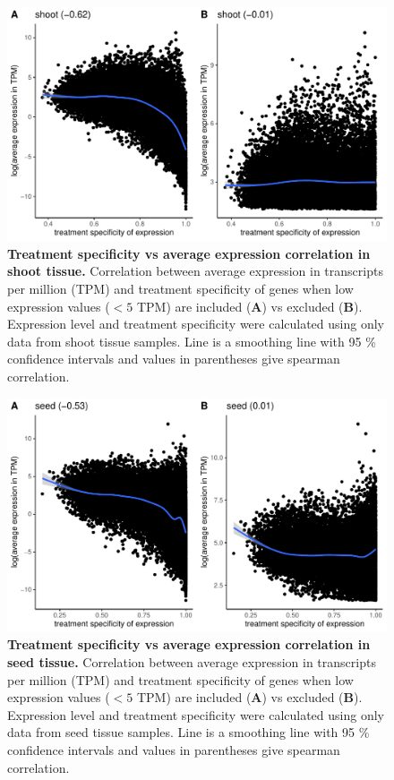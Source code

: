 \documentclass[12pt]{article}
\begin{document}
\begin{figure}[H]
\centering
\includegraphics[width = \linewidth]{figures/appendix_a/shoot_treatmentSpecificityVsAverageExpression_withVsWithoutZeros.pdf}
\caption{\textbf{Treatment specificity vs average expression correlation in shoot tissue.} Correlation between average expression in transcripts per million (TPM) and treatment specificity of genes when low expression values ($< 5$ TPM) are included (\textbf{A}) vs excluded (\textbf{B}). Expression level and treatment specificity were calculated using only data from shoot tissue samples. Line is a smoothing line with 95 \% confidence intervals and values in parentheses give spearman correlation.}%
\end{figure}

\begin{figure}[H]
\centering
\includegraphics[width = \linewidth]{figures/appendix_a/seed_treatmentSpecificityVsAverageExpression_withVsWithoutZeros.pdf}
\caption{\textbf{Treatment specificity vs average expression correlation in seed tissue.} Correlation between average expression in transcripts per million (TPM) and treatment specificity of genes when low expression values ($< 5$ TPM) are included (\textbf{A}) vs excluded (\textbf{B}). Expression level and treatment specificity were calculated using only data from seed tissue samples. Line is a smoothing line with 95 \% confidence intervals and values in parentheses give spearman correlation.}%
\end{figure}
\end{document}
